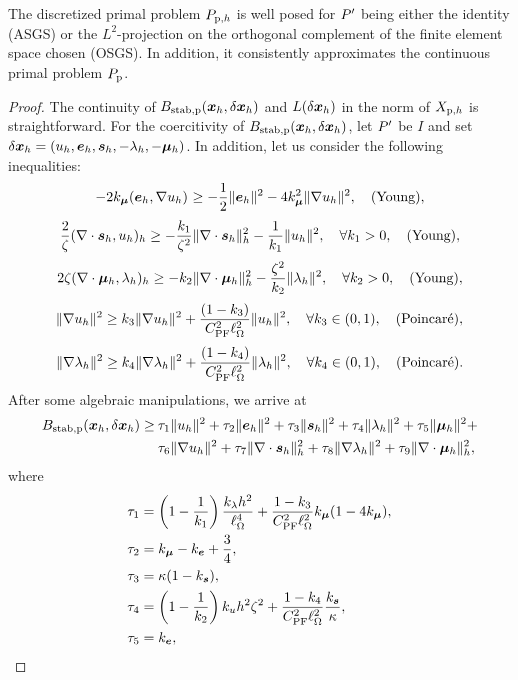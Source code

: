 \begin{theorem}
The discretized primal problem $\Pph$ is well posed for $\Pt$ being either the identity (ASGS) or the $L^2$-projection on the orthogonal complement of the finite element space chosen (OSGS). In addition, it consistently approximates the continuous primal problem $\Pp$.   
\end{theorem}
%

\begin{proof}
The continuity of $\Bsp(\xFh,\delta\xFh)$ and $L(\delta\xFh)$ in the norm of $\XSph$ is straightforward. For the coercitivity of $\Bsp(\xFh,\delta\xFh)$, 
let $\Pt$ be $I$ and set 
$\delta\xFh = (\uFh,\eFh,\sFh,-\lFh,-\mFh)$.
In addition, let us consider the following inequalities:
$$-2\km\iprod[]{\eFh}{\nabla\uFh} \geq -\frac12\norm[]{\eFh}^2-4\km^2\norm[]{\nabla\uFh}^2, \quad\text{(Young)}, $$
%
$$\frac{2}{\zeta}\iprod[h]{\nabla\cdot\sFh}{\uFh} \geq -\frac{\kYus}{\zeta^2}\norm[h]{\nabla\cdot \sFh}^2-\frac{1}{\kYus}\norm[]{\uFh}^2,\quad\forall\kYus > 0, \quad\text{(Young)},$$
%
$$2\zeta\iprod[h]{\nabla\cdot\mFh}{\lFh} \geq -\kYlm\norm[h]{\nabla\cdot\mFh}^2-\frac{\zeta^2}{\kYlm}\norm[]{\lFh}^2,\quad \forall\kYlm > 0,\quad\text{(Young)},$$
%
$$ \norm[]{\nabla\uFh}^2 \geq \kPu\norm[]{\nabla\uFh}^2+\frac{(1-\kPu)}{\CPF^2\length^2}\norm[]{\uFh}^2,\quad \forall\kPu\in(0, 1),\quad\text{(Poincaré)},$$
%
$$ \norm[]{\nabla\lFh}^2 \geq \kPl\norm[]{\nabla\lFh}^2+\frac{(1-\kPl)}{\CPF^2\length^2}\norm[]{\lFh}^2,\quad \forall\kPl\in(0, 1),\quad\text{(Poincaré)}.$$
After some algebraic manipulations, we arrive at
\begin{align*}
\Bsp(\xFh,\delta\xFh) \geq 
&\: \ttu\norm[]{\uFh}^2+
    \tte\norm[]{\eFh}^2+
    \tts\norm[]{\sFh}^2+
    \ttl\norm[]{\lFh}^2+
    \ttm\norm[]{\mFh}^2+
    \\    
&\: \ttdu\norm[]{\nabla\uFh}^2+
    \ttds\norm[h]{\nabla\cdot\sFh}^2+ 
    \ttdl\norm[]{\nabla\lFh}^2+
    \ttdm\norm[h]{\nabla\cdot\mFh}^2,
\end{align*}
where
\begin{align*}
    \ttu &= \left(1-\frac{1}{\kYus}\right)\frac{\kl h^2}{\length^4}+\frac{1-\kPu}{\CPF^2\length^2}\km(1-4\km),\\
    \tte &= \km
    -\ke+\frac34,\\
    \tts &= \kappa(1-\ks),\\
    \ttl &= \left(1-\frac{1}{\kYlm}\right)\ku h^2\zeta^2+\frac{1-\kPl}{\CPF^2\length^2}\frac{\ks}{\kappa},\\
    \ttm &= \ke,\\

\end{align*}
\end{proof}
